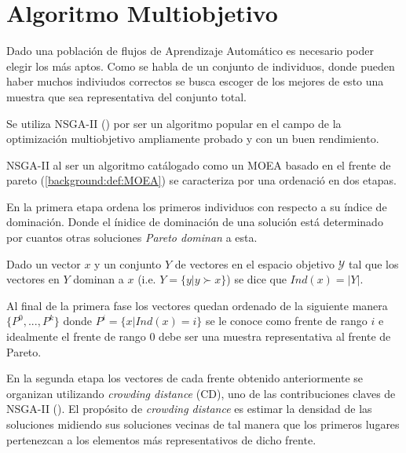 \section{Algoritmo Multiobjetivo}


Dado una poblaci\'on de flujos de Aprendizaje Autom\'atico es necesario poder elegir los m\'as aptos. Como se habla de un conjunto de individuos, donde pueden haber muchos indiviudos correctos se busca escoger de los mejores de esto una muestra que sea representativa del conjunto total.

Se utiliza NSGA-II (\cite{deb2002fast}) por ser un algoritmo popular en el campo de la optimizaci\'on multiobjetivo ampliamente probado y con un buen rendimiento. 

NSGA-II al ser un algoritmo cat\'alogado como un MOEA basado en el frente de pareto (\ref{background:def:MOEA}) se caracteriza por una ordenaci\'o en dos etapas.

En la primera etapa ordena los primeros individuos con respecto a su \'indice de dominaci\'on. Donde el \'inidice de dominaci\'on de una soluci\'on est\'a determinado por cuantos otras soluciones \textit{Pareto dominan} a esta.
\begin{definition}
    Dado un vector $x$ y un conjunto $Y$ de vectores en el espacio objetivo $\mathcal{Y}$ tal que los vectores en $Y$ dominan a $x$ (i.e. $Y = \{y | y \succ x\}$) se dice que $Ind(x) = |Y|$.
\end{definition}
Al final de la primera fase los vectores quedan ordenado de la siguiente manera
$\{P^0, ..., P^k\}$ donde  $P^i = \{x | Ind(x) = i\}$ se le conoce como frente de rango $i$ e idealmente el frente de rango $0$ debe ser una muestra representativa al frente de Pareto.

En la segunda etapa los vectores de cada frente obtenido anteriormente se organizan utilizando \textit{crowding distance} (CD), uno de las contribuciones claves de NSGA-II (\cite{deb2002fast}). El prop\'osito de \textit{crowding distance} es estimar la densidad de las soluciones midiendo sus soluciones vecinas de tal manera que los primeros lugares pertenezcan a los elementos m\'as representativos de dicho frente.

